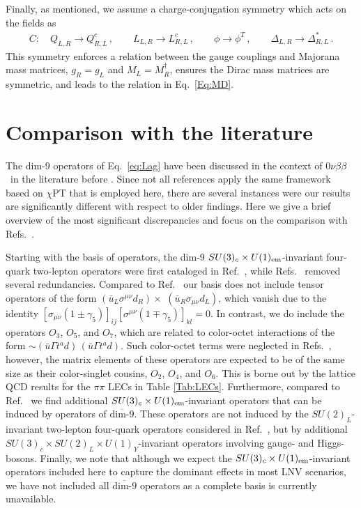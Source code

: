 \documentclass[letterpaper,11pt]{article}
\newcommand{\g}{\gamma}
\newcommand{\Dt}{\Delta}
\newcommand{\bea}{\begin{eqnarray}}
\newcommand{\eea}{\end{eqnarray}}
\newcommand{\NLDBD}{$0 \nu \beta \beta$}
\newcommand{\textoverline}[1]{$\overline{\mbox{#1}}$}
\begin{document}
Finally, as mentioned, we assume a charge-conjugation symmetry which acts on the fields as
\bea
C:\quad Q_{L,R}\to Q_{R,L}^c\,,\qquad  L_{L,R}\to L_{R,L}^c\,,\qquad \phi\to \phi^T\,,\qquad \Delta_{L,R}\to \Dt_{R,L}^*\,.
\eea
This symmetry  enforces a relation between the gauge couplings and Majorana mass matrices, $g_R = g_L$ and $M_L = M_R^\dagger$,  ensures the Dirac mass matrices are symmetric, and leads to  the relation in Eq.\ \eqref{Eq:MD}. 


\section{Comparison with the literature}\label{comparison-to-lit}
The dim-9 operators of Eq.\ \eqref{eq:Lag} have been discussed in the context of \NLDBD\ in the literature before \cite{Gonzalez:2015ady,Faessler:1996ph,Pas:2000vn,Prezeau:2003xn,Graesser:2016bpz}. Since not all references apply the same framework based on $\chi$PT that is employed here, there are several instances were our results are significantly different with respect to older findings. Here we give a brief overview of the most significant discrepancies and focus on the comparison with Refs.\ \cite{Pas:2000vn,Gonzalez:2015ady}.


Starting with the basis of operators, the dim-9 $SU(3)_c \times U(1)_{\rm em}$-invariant four-quark two-lepton operators were first cataloged in Ref.\ \cite{Pas:2000vn},
while Refs.\ \cite{Graesser:2016bpz,Prezeau:2003xn} removed several redundancies. 
Compared to Ref.\ \cite{Pas:2000vn} our basis does not include tensor operators of the form $(\bar u_L \sigma^{\mu\nu} d_R)\times$ $(\bar u_R \sigma_{\mu\nu} d_L)$, which vanish due to the identity $\left[\sigma_{\mu\nu}(1\pm \g_5)\right]_{ij} \left[\sigma^{\mu\nu}(1\mp \g_5)\right]_{kl} = 0$. In contrast, we do include the operators $O_3$, $O_5$, and $O_7$, which are related to color-octet interactions of the form $\sim (\bar u\Gamma t^ad )\, (\bar u\Gamma t^ad )$. Such color-octet terms were neglected in Refs.\ \cite{Prezeau:2003xn,Graf:2018ozy}, however, the matrix elements of these operators are expected to be of the same size as their color-singlet cousins, $O_2$, $O_4$, and $O_6$. This is borne out by the lattice QCD results for the $\pi\pi$ LECs in Table \ref{Tab:LECs}. Furthermore, compared to Ref.\ \cite{Graesser:2016bpz} we find additional $SU(3)_c\times U(1)_{\rm em}$-invariant operators that can be induced by operators of \textoverline{dim-9}. These operators are not induced by the $SU(2)_L$-invariant two-lepton four-quark operators considered in Ref.\ \cite{Graesser:2016bpz}, but by additional $SU(3)_c\times SU(2)_L\times U(1)_Y$-invariant operators involving gauge- and Higgs-bosons. Finally, we note that although we expect the  $SU(3)_c\times U(1)_{\rm em}$-invariant operators included here to capture the dominant effects in most LNV scenarios, we have not included all \textoverline{dim-9} operators as a complete basis is currently unavailable.
\end{document}
